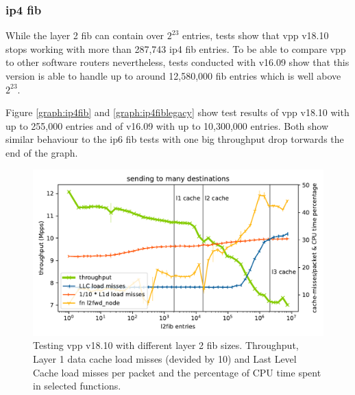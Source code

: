 \subsubsection{\Ac{ip4} \Ac{fib}}
\label{sec:ip4fib}

While the layer 2 \Ac{fib} can contain over $2^{23}$ entries, tests
show that \Ac{vpp} v18.10 stops working with more than 287,743
\Ac{ip4} \Ac{fib} entries. To be able to compare \Ac{vpp} to other
software routers nevertheless, tests conducted with v16.09 show that
this version is able to handle up to around 12,580,000 \Ac{fib}
entries which is well above $2^{23}$.

Figure \ref{graph:ip4fib} and \ref{graph:ip4fiblegacy} show test results of \Ac{vpp} v18.10 with up to 255,000 entries and of v16.09 with up to 10,300,000 entries. Both show similar behaviour to the \Ac{ip6} \Ac{fib} tests with one big throughput drop torwards the end of the graph. 



\begin{figure}[!ht]
\noindent\hspace{0.5mm}\includegraphics[width=\linewidth]{pics/throughput_l2_throughmac_klaipeda32ghz_v3.pdf}
\caption{Testing \Ac{vpp} v18.10 with different layer 2 \Ac{fib} sizes. Throughput, Layer 1 data cache load misses (devided by 10) and Last Level Cache load misses per packet and the percentage of CPU time spent in selected functions. }
\label{graph:l2fib}
\end{figure}

